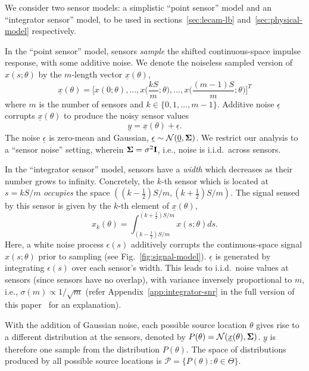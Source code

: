\documentclass[conference,letterpaper]{IEEEtran}
\providecommand{\v}{}
\renewcommand{\v}[1]{\underline{#1}}
\providecommand{\m}{}
\renewcommand{\m}[1]{{\bf #1}}
\begin{document}
We consider two sensor models: a simplistic ``point sensor'' model and an
``integrator sensor'' model, to be used in sections~\ref{sec:lecam-lb}
and~\ref{sec:physical-model} respectively.

In the ``point sensor'' model, sensors \emph{sample} the shifted
continuous-space impulse response, with some additive noise. We denote the
noiseless sampled version of $x(s; \theta)$ by the $m$-length vector $\v
x(\theta)$,
\begin{equation} \label{eq:sampled-signal}
	\v x(\theta) = \bigg[x(0; \theta), \ldots, x\Big(\frac{kS}{m}; \theta\Big), \ldots, x\Big(\frac{(m{-}1)S}{m}; \theta\Big)\bigg]^T
\end{equation}
where $m$ is the number of sensors and $k \in \{0, 1, \ldots, m-1\}$. Additive
noise $\v \epsilon$ corrupts $\v x(\theta)$ to produce the noisy sensor values
\begin{equation} \label{eq:sensor-obs}
	\v y = \v x(\theta) + \v \epsilon.
\end{equation}
The noise $\v \epsilon$ is zero-mean and Gaussian, $\v \epsilon \sim
\mathcal{N}(\v 0, \m \Sigma)$. We restrict our analysis to a ``sensor noise''
setting, wherein $\m\Sigma = \sigma^2 \m I$, i.e., noise is i.i.d.\ across
sensors.

In the ``integrator sensor'' model, sensors have a \emph{width} which decreases
as their number grows to infinity. Concretely, the \mbox{$k$-th} sensor which
is located at $s = kS/m$ \emph{occupies} the space $((k{-}\frac{1}{2})S/m,
(k{+}\frac{1}{2})S/m)$.  The signal sensed by this sensor is given by the
$k$-th element of $\v x(\theta)$,
\begin{equation} \label{eq:samples-int-model}
	x_k(\theta) = \int_{(k-\frac{1}{2})S/m}^{(k+\frac{1}{2})S/m} x(s;\theta) ds.
\end{equation}
Here, a white noise process $\epsilon(s)$ additively corrupts the
continuous-space signal $x(s;\theta)$ prior to sampling (see
Fig.~\ref{fig:signal-model}). $\v \epsilon$ is generated by integrating
$\epsilon(s)$ over each sensor's width. This leads to i.i.d.\ noise values at
sensors (since sensors have no overlap), with variance inversely proportional
to $m$, i.e., $\sigma(m) \propto 1/\sqrt{m}$ (refer
Appendix~\ref{app:integrator-snr} in the full version of this
paper~\cite{FullVersion} for an explanation).

With the addition of Gaussian noise, each possible source location $\theta$
gives rise to a different distribution at the sensors, denoted by $P(\theta) =
\mathcal{N}(\v x(\theta), \m \Sigma)$. $\v y$ is therefore one sample from the
distribution $P(\theta)$. The space of distributions produced by all possible
source locations is $\mathcal{P} = \{P(\theta) : \theta \in \Theta \}$.
\end{document}
